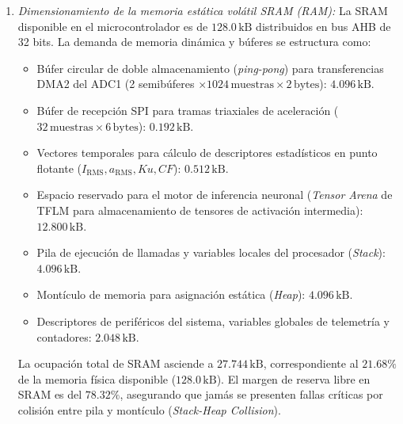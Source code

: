 \begin{enumerate}
    \item \textit{Dimensionamiento de la memoria estática volátil SRAM (RAM):} La SRAM disponible en el microcontrolador es de $128.0\,\text{kB}$ distribuidos en bus AHB de 32 bits. La demanda de memoria dinámica y búferes se estructura como:
    \begin{itemize}
        \item Búfer circular de doble almacenamiento (\textit{ping-pong}) para transferencias DMA2 del ADC1 (2 semibúferes $\times 1024\,\text{muestras} \times 2\,\text{bytes}$): $4.096\,\text{kB}$.
        \item Búfer de recepción SPI para tramas triaxiales de aceleración ($32\,\text{muestras} \times 6\,\text{bytes}$): $0.192\,\text{kB}$.
        \item Vectores temporales para cálculo de descriptores estadísticos en punto flotante ($I_{\text{RMS}}, a_{\text{RMS}}, Ku, CF$): $0.512\,\text{kB}$.
        \item Espacio reservado para el motor de inferencia neuronal (\textit{Tensor Arena} de TFLM para almacenamiento de tensores de activación intermedia): $12.800\,\text{kB}$.
        \item Pila de ejecución de llamadas y variables locales del procesador (\textit{Stack}): $4.096\,\text{kB}$.
        \item Montículo de memoria para asignación estática (\textit{Heap}): $4.096\,\text{kB}$.
        \item Descriptores de periféricos del sistema, variables globales de telemetría y contadores: $2.048\,\text{kB}$.
    \end{itemize}
    La ocupación total de SRAM asciende a $27.744\,\text{kB}$, correspondiente al $21.68\%$ de la memoria física disponible ($128.0\,\text{kB}$). El margen de reserva libre en SRAM es del $78.32\%$, asegurando que jamás se presenten fallas críticas por colisión entre pila y montículo (\textit{Stack-Heap Collision}).


\end{enumerate}
